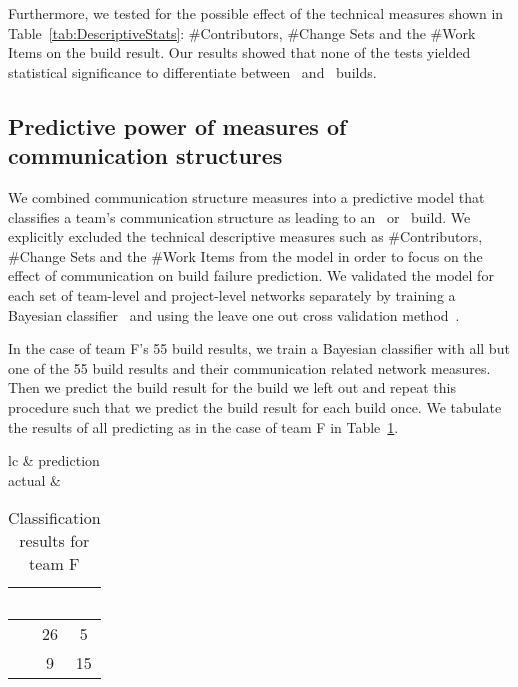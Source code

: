 Furthermore, we tested for the possible effect of the technical measures shown in
Table~\ref{tab:DescriptiveStats}: \#Contributors, \#Change Sets and the \#Work
Items on the build result. Our results showed that none of the tests yielded statistical
significance to differentiate between \error\ and \ok\ builds.


\subsection{Predictive power of measures of communication structures}

We combined communication structure measures into a predictive model
that classifies a team's communication structure as leading to an \error\ or \ok\
build. We explicitly excluded the technical descriptive measures such as
\#Contributors, \#Change Sets and the \#Work Items from the model in order to
focus on the effect of communication on build failure prediction. We validated the
model for each set of team-level and project-level networks separately by
training a Bayesian classifier~\cite{Hastie:2003ys} and using the leave one
out cross validation method~\cite{Hastie:2003ys}.

In the case of team F's 55 build results, we train a Bayesian classifier with all but one of the 55 build results and their communication related network measures. 
Then we predict the build result for the build we left out and repeat this procedure such that we predict the build result for each build once.
We tabulate the results of all predicting as in the case of team F in Table~\ref{tab:cont}.

\begin{table}[t] \centering\small
\caption{Classification results for team F}
\begin{tabular}{lc}
& prediction \\
actual & 
\begin{tabular}{r|c|c|}
& \ok\ & \error\ \\\hline
\ok\ & 26 & 5 \\\hline
\error\ & 9 & 15 \\\hline
\end{tabular}
\end{tabular}
\label{tab:cont}
\vspace{20pt}
\end{table}

